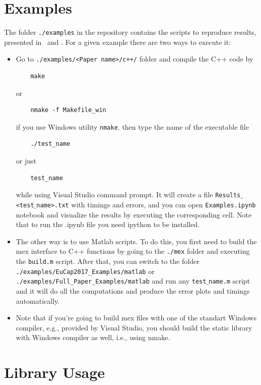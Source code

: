 \documentclass[a4wide,11pt]{article}
\renewcommand{\[}{\begin{equation}}
\renewcommand{\]}{\end{equation}}
\renewcommand{\{}{\begin{eqnarray}}
\renewcommand{\}}{\end{eqnarray}}
\begin{document}
\section{Examples}
The folder \texttt{./examples} in the repository contains the scripts to reproduce results, presented in~\cite{Tambova_EuCap2017} and \cite{Tambova2017}. For a given example there are two ways to execute it:\\
\begin{itemize}
	\item 
	Go to \texttt{./examples/<Paper name>/c++/} folder and compile the C++ code by 
	\begin{verbatim}
	make
	\end{verbatim}
	or
	\begin{verbatim}
	nmake -f Makefile_win
	\end{verbatim}
	if you use Windows utility \texttt{nmake}.
	then type the name of the executable file
	\begin{verbatim}
	./test_name
	\end{verbatim}
	or just
	\begin{verbatim}
	test_name
	\end{verbatim} while using Visual Studio command prompt.
	It will create a file \texttt{Results$\_$<test$\_$name>.txt} with timings and errors, and you can open \texttt{Examples.ipynb} notebook and visualize the results by executing the corresponding cell. Note that to run the .ipynb file you need ipython to be installed.
	\item
	The other way is to use Matlab scripts. To do this, you first need to build the mex interface to C++ functions by going to the \texttt{./mex} folder and executing the \texttt{build.m} script. After that, you can switch to the folder \\
	\texttt{./examples/EuCap2017\_Examples/matlab} or \texttt{./examples/Full\_Paper\_Examples/matlab} and run any \texttt{test$\_$name.m} script and it will do all the computations and produce the error plots and timings automatically.
	\item
	Note that if you're going to build mex files with one of the standart Windows compiler, e.g., provided by Visual Studio, you should build the static library with Windows compiler as well, i.e., using nmake.
\end{itemize}
\section{Library Usage}
\end{document}

